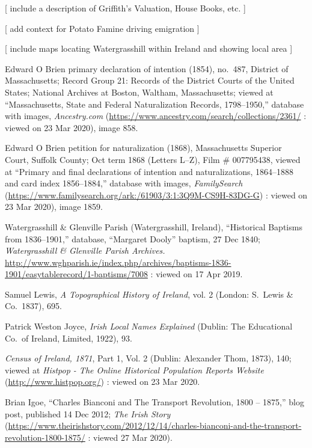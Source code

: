 [ include a description of Griffith's Valuation, House Books, etc. ]

[ add context for Potato Famine driving emigration ]

[ include maps locating Watergrasshill within Ireland and showing local area ]



\begin{thebibliography}{999}

Edward O Brien primary declaration of intention (1854), no.\ 487, 
District of Massachusetts; 
Record Group 21: Records of the District Courts of the United States; 
National Archives at Boston, Waltham, Massachusetts;
viewed at ``Massachusetts, State and Federal Naturalization Records, 1798--1950,''
database with images, \textit{Ancestry.com} (\url{https://www.ancestry.com/search/collections/2361/} : viewed on 23 Mar 2020), image 858.

Edward O Brien petition for naturalization (1868), 
Massachusetts Superior Court, Suffolk County; 
Oct term 1868 (Letters L--Z), Film \# 007795438,
viewed at ``Primary and final declarations of intention and naturalizations, 1864--1888 and card index 1856--1884,''
database with images, \textit{FamilySearch} (\url{https://www.familysearch.org/ark:/61903/3:1:3Q9M-CS9H-83DG-G}) : viewed on 23 Mar 2020), image 1859.

Watergrasshill \& Glenville Parish (Watergrasshill, Ireland), ``Historical Baptisms from 1836--1901,'' database, ``Margaret Dooly'' baptism, 27 Dec 1840; \textit{Watergrasshill \& Glenville Parish Archives.} \url{http://www.wghparish.ie/index.php/archives/baptisms-1836-1901/easytablerecord/1-baptisms/7008} : viewed on 17 Apr 2019.

Samuel Lewis, \textit{A Topographical History of Ireland}, vol. 2 (London: S.\ Lewis \& Co.\, 1837), 695.

Patrick Weston Joyce, \textit{Irish Local Names Explained} (Dublin: The Educational Co.\ of Ireland, Limited, 1922), 93.

\textit{Census of Ireland, 1871}, Part 1, Vol. 2 (Dublin: Alexander Thom, 1873), 140; viewed at \textit{Histpop - The Online Historical Population Reports Website} (\url{http://www.histpop.org/}) : viewed on 23 Mar 2020.

Brian Igoe, ``Charles Bianconi and The Transport Revolution, 1800 -- 1875,'' blog post, published 14 Dec 2012; \textit{The Irish Story} (\url{https://www.theirishstory.com/2012/12/14/charles-bianconi-and-the-transport-revolution-1800-1875/} : viewed 27 Mar 2020).


\end{thebibliography}
